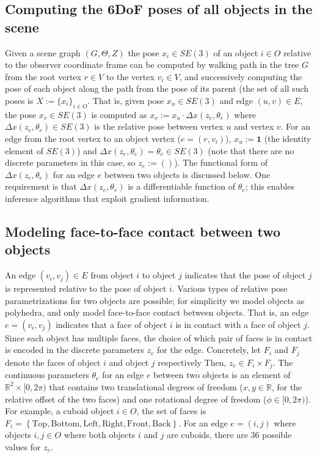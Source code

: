 \subsection{Computing the 6DoF poses of all objects in the scene} \label{section:poses}
Given a scene graph $(G, \Theta, Z)$ the pose $x_i \in SE(3)$ of an object $i \in O$ relative to the observer coordinate frame can be computed by walking path in the tree $G$ from the root vertex $r \in V$ to the vertex $v_i \in V$, and successively computing the pose of each object along the path from the pose of its parent (the set of all such poses is $X := \{x_i\}_{i \in O}$.
That is, given pose $x_u \in SE(3)$ and edge $(u, v) \in E$, the pose $x_v \in SE(3)$ is computed as $x_v := x_u \cdot \Delta x(z_e, \theta_e)$ where $\Delta x(z_e, \theta_e) \in SE(3)$ is the relative pose between vertex $u$ and vertex $v$.
For an edge from the root vertex to an object vertex ($e = (r, v_i)$), $x_u := \mathbf{1}$ (the identity element of $SE(3)$) and $\Delta x(z_e, \theta_e) = \theta_e \in SE(3)$ (note that there are no discrete parameters in this case, so $z_e := ()$).
The functional form of $\Delta x(z_e, \theta_e)$ for an edge $e$ between two objects is discussed below.
One requirement is that $\Delta x(z_e, \theta_e)$ is a differentiable function of $\theta_e$; this enables inference algorithms that exploit gradient information.

\subsection{Modeling face-to-face contact between two objects}
An edge $(v_i, v_j) \in E$ from object $i$ to object $j$ indicates that the pose of object $j$ is represented relative to the pose of object $i$.
Various types of relative pose parametrizations for two objects are possible; for simplicity we model objects as polyhedra, and only model face-to-face contact between objects.
That is, an edge $e = (v_i, v_j)$ indicates that a face of object $i$ is in contact with a face of object $j$.
Since each object has multiple faces, the choice of which pair of faces is in contact is encoded in the discrete parameters $z_e$ for the edge.
Concretely, let $F_i$ and $F_j$ denote the faces of object $i$ and object $j$ respectively
Then, $z_e \in F_i \times F_j$.
The continuous parameters $\theta_e$ for an edge $e$ between two objects is an element of $\mathbb{R}^2 \times [0, 2 \pi)$ that contains two translational degrees of freedom ($x, y \in \mathbb{R}$, for the relative offset of the two faces) and one rotational degree of freedom ($\phi \in [0, 2 \pi)$).
For example, a cuboid object $i \in O$, the set of faces is $F_i = \left\{\mathrm{Top, Bottom, Left, Right, Front, Back}\right\}$.
For an edge $e = (i, j)$ where objects $i, j \in O$ where both objects $i$ and $j$ are cuboids, there are 36 possible values for $z_e$.

